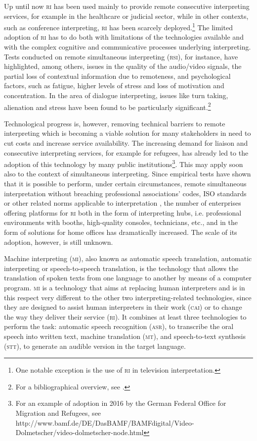 \documentclass[output=paper]{langsci/langscibook}
\begin{document}
Up until now \textsc{ri} has been used mainly to provide remote consecutive interpreting services, for example in the healthcare or judicial sector, while in other contexts, such as conference interpreting, \textsc{ri} has been scarcely deployed.\footnote{One notable exception is the use of \textsc{ri} in television interpretation.} The limited adoption of \textsc{ri} has to do both with limitations of the technologies available and with the complex cognitive and communicative processes underlying interpreting. Tests conducted on remote simultaneous interpreting (\textsc{rsi}), for instance, have highlighted, among others, issues in the quality of the audio/video signals, the partial loss of contextual information due to remoteness, and psychological factors, such as fatigue, higher levels of stress and loss of motivation and concentration. In the area of dialogue interpreting, issues like turn taking, alienation and stress have been found to be particularly significant.\footnote{For a bibliographical overview, see \citet{Andres2009}.}
 
Technological progress is, however, removing technical barriers to remote interpreting which is becoming a viable solution for many stakeholders in need to cut costs and increase service availability. The increasing demand for liaison and consecutive interpreting services, for example for refugees, has already led to the adoption of this technology by many public institutions\footnote{For an example of adoption in 2016 by the German Federal Office for Migration and Refugees, see http://www.bamf.de/DE/DasBAMF/BAMFdigital/Video-Dolmetscher/video-dolmetscher-node.html}. This may apply soon also to the context of simultaneous interpreting. Since empirical tests have shown that it is possible to perform, under certain circumstances, remote simultaneous interpretation without breaching professional associations’ codes, ISO standards or other related norms applicable to interpretation \citep[202]{Causo2011b}, the number of enterprises offering platforms for \textsc{ri} both in the form of interpreting hubs, i.e. professional environments with booths, high-quality consoles, technicians, etc., and in the form of solutions for home offices has dramatically increased. The scale of its adoption, however, is still unknown.   
 
Machine interpreting (\textsc{mi}), also known as automatic speech translation, automatic interpreting or speech-to-speech translation, is the technology that allows the translation of spoken texts from one language to another by means of a computer program. \textsc{mi} is a technology that aims at replacing human interpreters and is in this respect very different to the other two interpreting-related technologies, since they are designed to assist human interpreters in their work (\textsc{cai}) or to change the way they deliver their service (\textsc{ri}). It combines at least three technologies to perform the task: automatic speech recognition (\textsc{asr}), to transcribe the oral speech into written text, machine translation (\textsc{mt}), and speech-to-text synthesis (\textsc{stt}), to generate an audible version in the target language. 
 
\end{document}
